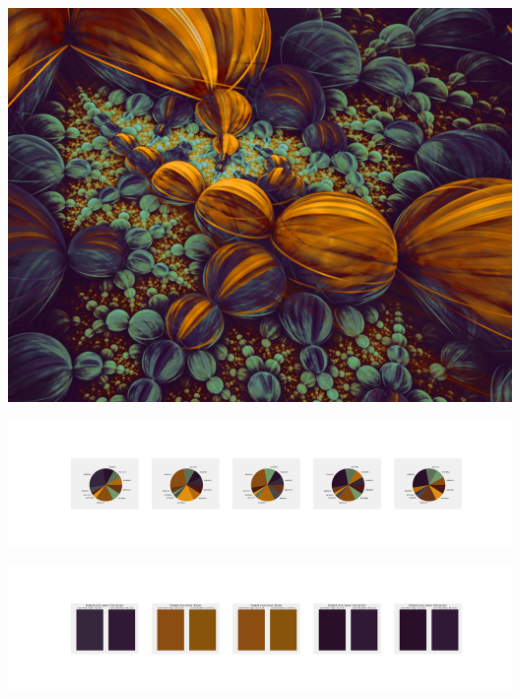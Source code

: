\documentclass[11pt]{article}
\begin{document}
\begin{landscape}
    \begin{center}
    \includegraphics[width=\textwidth]{./nbimg/file (335).jpg}
    \end{center}

    \begin{center}
    \includegraphics[width=250mm]{./nbimg/pie-262.jpg}
    \end{center}

    \begin{center}
    \includegraphics[width=250mm]{./nbimg/peak-262.jpg}
    \end{center}
    


\end{landscape}
\end{document}
